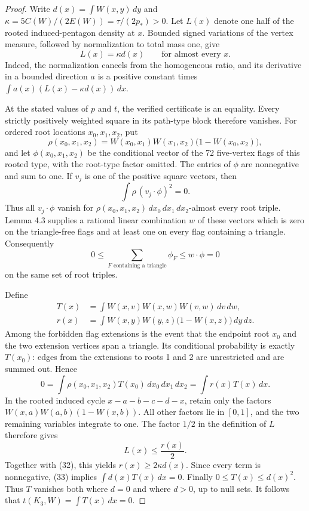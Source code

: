 \documentclass[11pt]{amsart}
\theoremstyle{definition}
\theoremstyle{remark}
\begin{document}
\begin{proof}
Write $d(x)=\int W(x,y)\,dy$ and
$\kappa=5C(W)/(2E(W))=\tau/(2p_\ast)>0$.
Let $L(x)$ denote one half of the rooted induced-pentagon density at $x$.
Bounded signed variations of the vertex measure, followed by normalization
to total mass one, give
\begin{equation}\tag{32}\label{eq:32}
 L(x)=\kappa d(x)\qquad\text{for almost every }x.
\end{equation}
Indeed, the normalization cancels from the homogeneous ratio, and its
derivative in a bounded direction $a$ is a positive constant times
$\int a(x)(L(x)-\kappa d(x))\,dx$.

At the stated values of $p$ and $t$, the verified certificate is an equality.
Every strictly positively weighted square in its path-type block therefore
vanishes. For ordered root locations $x_0,x_1,x_2$, put
\[
 \rho(x_0,x_1,x_2)=W(x_0,x_1)W(x_1,x_2)\bigl(1-W(x_0,x_2)\bigr),
\]
and let $\phi(x_0,x_1,x_2)$ be the conditional vector of the 72 five-vertex
flags of this rooted type, with the root-type factor omitted. The entries of
$\phi$ are nonnegative and sum to one. If $v_j$ is one of the positive square
vectors, then
\[
 \int\rho\,(v_j\cdot\phi)^2=0.
\]
Thus all $v_j\cdot\phi$ vanish for
$\rho(x_0,x_1,x_2)\,dx_0\,dx_1\,dx_2$-almost every root triple.
Lemma 4.3 supplies a rational linear combination $w$ of these vectors which
is zero on the triangle-free flags and at least one on every flag containing
a triangle. Consequently
\[
 0\leq\sum_{F\text{ containing a triangle}}\phi_F\leq w\cdot\phi=0
\]
on the same set of root triples.

Define
\[
 \begin{split}
 T(x)&=\int W(x,v)W(x,w)W(v,w)\,dv\,dw,\\
 r(x)&=\int W(x,y)W(y,z)\bigl(1-W(x,z)\bigr)\,dy\,dz.
 \end{split}
\]
Among the forbidden flag extensions is the event that the endpoint root
$x_0$ and the two extension vertices span a triangle. Its conditional
probability is exactly $T(x_0)$: edges from the extensions to roots 1 and 2
are unrestricted and are summed out. Hence
\begin{equation}\tag{33}\label{eq:33}
 0=\int\rho(x_0,x_1,x_2)T(x_0)\,dx_0\,dx_1\,dx_2
   =\int r(x)T(x)\,dx.
\end{equation}
In the rooted induced cycle $x-a-b-c-d-x$, retain only the factors
$W(x,a)W(a,b)(1-W(x,b))$. All other factors lie in $[0,1]$, and the two
remaining variables integrate to one. The factor $1/2$ in the definition of
$L$ therefore gives
\[
 L(x)\leq\frac{r(x)}2.
\]
Together with (32), this yields $r(x)\geq2\kappa d(x)$. Since every term
is nonnegative, (33) implies $\int d(x)T(x)\,dx=0$. Finally
$0\leq T(x)\leq d(x)^2$. Thus $T$ vanishes both where $d=0$ and where
$d>0$, up to null sets. It follows that $t(K_3,W)=\int T(x)\,dx=0$.
\end{proof}
\end{document}
